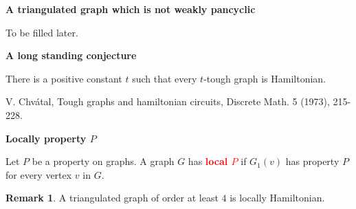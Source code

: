 \documentclass{beamer}
\theoremstyle{plain}
\theoremstyle{definition}
\newtheorem{rem}[thm]{Remark}
\begin{document}
\begin{frame}{\bf A triangulated graph which is not weakly pancyclic}

To be filled later. 
\end{frame}



\begin{frame}{\bf A long standing conjecture}

There is a positive constant $t$ such that every $t$-tough graph is Hamiltonian.
\bigskip

V. Chv\'{a}tal, Tough graphs and hamiltonian circuits, Discrete Math. 5 (1973), 215-228.

\end{frame}













\begin{frame}{\bf Locally property $P$}

Let $P$ be a property on graphs.
A graph $G$ has \textcolor{red}{\bf local $P$} if $G_1(v)$ has property $P$ for every vertex $v$ in $G$.
\bigskip




\begin{center}
\end{center}
\bigskip


\begin{rem}
A triangulated graph of order at least $4$ is locally Hamiltonian.
\end{rem}
\end{frame}
\end{document}
